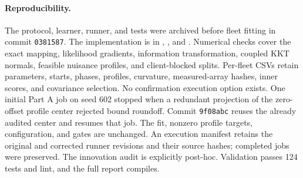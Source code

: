 \paragraph{Reproducibility.}
The protocol, learner, runner, and tests were archived before fleet fitting
in commit \texttt{0381587}. The implementation is in
,
, and
. Numerical checks cover the exact
mapping, likelihood gradients, information transformation, coupled KKT
normals, feasible nuisance profiles, and client-blocked splits.
Per-fleet CSVs retain parameters, starts, phases, profiles, curvature,
measured-array hashes, inner scores, and covariance selection. No confirmation
execution option exists.
One initial Part A job on seed 602 stopped when a redundant projection of the
zero-offset profile center rejected bound roundoff. Commit \texttt{9f08abc}
reuses the already audited center and resumes that job. The fit, nonzero
profile targets, configuration, and gates are unchanged. An execution manifest
retains the original and corrected runner revisions and their source hashes;
completed jobs were preserved. The innovation audit is explicitly post-hoc.
Validation passes 124 tests and lint, and the full report compiles.
